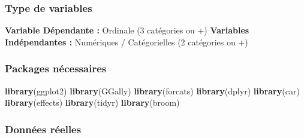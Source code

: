 \documentclass[
]{book}
\newenvironment{Shaded}{\begin{snugshade}}{\end{snugshade}}
\newcommand{\KeywordTok}[1]{\textcolor[rgb]{0.13,0.29,0.53}{\textbf{#1}}}
\newcommand{\NormalTok}[1]{#1}
\begin{document}
\hypertarget{type-de-variables-19}{%
\subsubsection{Type de variables}\label{type-de-variables-19}}

\textbf{Variable Dépendante :} Ordinale (3 catégories ou +)
\textbf{Variables Indépendantes :} Numériques / Catégorielles (2 catégories ou +)

\hypertarget{packages-nuxe9cessaires-19}{%
\subsubsection{Packages nécessaires}\label{packages-nuxe9cessaires-19}}

\begin{Shaded}
\begin{Highlighting}[]
\KeywordTok{library}\NormalTok{(ggplot2)}
\KeywordTok{library}\NormalTok{(GGally)}
\KeywordTok{library}\NormalTok{(forcats)}
\KeywordTok{library}\NormalTok{(dplyr)}
\KeywordTok{library}\NormalTok{(car)}
\KeywordTok{library}\NormalTok{(effects)}
\KeywordTok{library}\NormalTok{(tidyr)}
\KeywordTok{library}\NormalTok{(broom)}
\end{Highlighting}
\end{Shaded}

\hypertarget{donnuxe9es-ruxe9elles-19}{%
\subsubsection{Données réelles}\label{donnuxe9es-ruxe9elles-19}}
\end{document}
